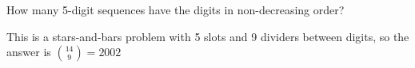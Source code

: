 \question How many 5-digit sequences have the digits in non-decreasing order?

\begin{solution}[0 cm]
This is a stars-and-bars problem with 5 slots and 9 dividers between 
digits, so the answer is ${14 \choose 9} = 2002$
\end{solution}
